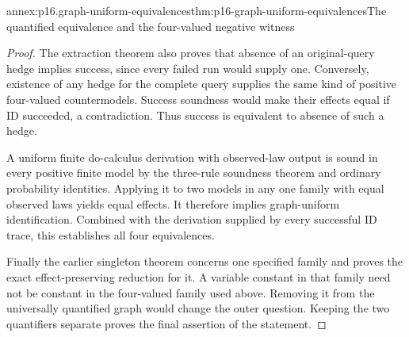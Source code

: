 \begin{annexitem}{annex:p16.graph-uniform-equivalences}{thm:p16-graph-uniform-equivalences}{The quantified equivalence and the four-valued negative witness}
\begin{proof}
The extraction theorem also proves that absence of an original-query
hedge implies success, since every failed run would supply one.
Conversely, existence of any hedge for the complete query supplies
the same kind of positive four-valued countermodels. Success soundness
would make their effects equal if ID succeeded, a contradiction.
Thus success is equivalent to absence of such a hedge.

A uniform finite do-calculus derivation with observed-law output is
sound in every positive finite model by the three-rule soundness
theorem and ordinary probability identities. Applying it to two
models in any one family with equal observed laws yields equal
effects. It therefore implies graph-uniform identification. Combined
with the derivation supplied by every successful ID trace, this
establishes all four equivalences.

Finally the earlier singleton theorem concerns one specified family
and proves the exact effect-preserving reduction for it. A variable
constant in that family need not be constant in the four-valued
family used above. Removing it from the universally quantified
graph would change the outer question. Keeping the two quantifiers
separate proves the final assertion of the statement.
\end{proof}
\end{annexitem}

